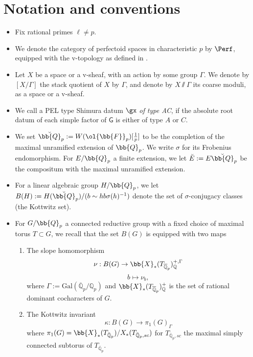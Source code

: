 \documentclass[letterpaper,11pt]{amsart}
\begin{document}
\section*{Notation and conventions} \label{Notation}
\begin{itemize}
\item Fix rational primes $\ell\neq p$. 
\item We denote the category of perfectoid spaces in characteristic $p$ by $\Perf$, equipped with the v-topology as defined in \cite{Ecod}.
\item Let $X$ be a space or a v-sheaf, with an action by some group $\Gamma$. We denote by $[X/\Gamma]$ the stack quotient of $X$ by $\Gamma$, and denote by $X\sslash\Gamma$ its coarse moduli, as a space or a v-sheaf.
\item We call a PEL type Shimura datum $\gx$ \textit{of type AC}, if the absolute root datum of each simple factor of $\mathsf{G}$ is either of type $A$ or $C$. 
\item We set $\Breve{\bb{Q}}_{p} := W(\ol{\bb{F}}_{p})[\frac{1}{p}]$ to be the completion of the maximal unramified extension of $\bb{Q}_{p}$. We write $\sigma$ for its Frobenius endomorphism.
For $E/\bb{Q}_{p}$ a finite extension, we let $\Breve{E} := E\Breve{\bb{Q}}_{p}$ be the compositum with the maximal unramified extension.  
\item For a linear algebraic group $H/\bb{Q}_{p}$, we let $B(H) := H(\Breve{\bb{Q}}_{p})/(b \sim hb\sigma(h)^{-1})$ denote the set of $\sigma$-conjugacy classes (the Kottwitz set). 
\item For $G/\bb{Q}_{p}$ a connected reductive group with a fixed choice of maximal torus $T \subset G$, we recall \cite{KottwitzIsocrystalsI,RR} that the set $B(G)$ is equipped with two maps 
\begin{enumerate}
\item The slope homomorphism
    \[ \nu: B(G) \rightarrow \bb{X}_*(T_{\overline{\mathbb{Q}}_{p}})^{+,\Gamma}_{\mathbb{Q}} \]
    \[ b \mapsto \nu_{b}, \]
    where $\Gamma := \mathrm{Gal}(\overline{\mathbb{Q}}_{p}/\mathbb{Q}_{p})$ and 
    $\bb{X}_*(T_{\overline{\mathbb{Q}}_{p}})_{\mathbb{Q}}^{+}$ is the set of rational dominant cocharacters of $G$. 
    \item The Kottwitz invariant
    \[ \kappa: B(G) \rightarrow \pi_{1}(G)_{\Gamma} \]
    where $\pi_1(G) = \bb{X}_*(T_{\bar{\mathbb{Q}}_{p}})/X_*(T_{\bar{\mathbb{Q}}_{p},sc})$ for $T_{\bar{\mathbb{Q}}_{p},sc}$ the maximal simply connected subtorus of $T_{\bar{\mathbb{Q}}_{p}}$. 
\end{enumerate}

\end{itemize}
\end{document}
